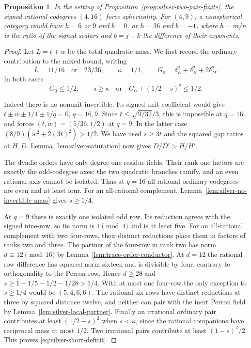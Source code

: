 \documentclass[11pt,reqno]{amsart}
\newtheorem{proposition}[theorem]{Proposition}
\theoremstyle{remark}\newtheorem{remark}[theorem]{Remark}
\numberwithin{equation}{section}
\begin{document}
\begin{proposition}\label{prop:silver-four-sixteen}
In the setting of Proposition~\ref{prop:silver-two-pair-finite}, the
signed rational codegrees $(4,16)$ force sphericality. For $(4,9)$,
a nonspherical category would have $h=6$ or $9$ and $b=0$, or
$h=36$ and $b=-1$, where $h=m/n$ is the ratio of the signed scalars
and $b=j-k$ the difference of their exponents.
\end{proposition}
\begin{proof}
Let $L=t+w$ be the total quadratic mass. We first record the
ordinary contribution to the mixed bound, writing
\[
 L=11/16\quad\text{or}\quad23/36,\qquad \kappa=1/4,
 \qquad G_0=\delta_E^2+\delta_H^2+2\delta_D^2 .
\]
In both cases
\begin{equation}\label{eq:silver-short-deficit}
 G_0\le1/2,\qquad s\ge\kappa\quad\text{or}\quad
 G_0+(1/2-s)^2\le1/2 .
\end{equation}

Indeed there is no nonunit invertible. Its signed unit coefficient
would give $t\pm w\pm1/4\pm1/q=0$, $q=16,9$. Since
$t\le\sqrt{9/32}/3$, this is impossible at $q=16$ and forces
$(t,w)=(5/36,1/2)$ at $q=9$. In the latter case
$(8/9)(w^2+2(3t)^2)>1/2$. We have used $s\ge3t$ and the
squared gap ratios at $H,D$. Lemma~\ref{lem:silver-saturation}
now gives $D/D'>H/H'$.

The dyadic orders have only degree-one residue fields. Their
rank-one factors are exactly the odd-codegree axes: the two
quadratic branches ramify, and an even rational axis cannot be
isolated. Thus at $q=16$ all rational ordinary codegrees are even
and at least four. For an all-rational complement,
Lemma~\ref{lem:silver-no-invertible-mass} gives $s\ge1/4$.

At $q=9$ there is exactly one isolated odd row. Its reduction agrees
with the signed nine-row, so its norm is $1\pmod4$ and is at least
five. For an all-rational complement with two four-rows, their
distinct reductions place them in factors of ranks two and three.
The partner of the four-row in rank two has norm $d\equiv12\pmod{16}$
by Lemma~\ref{lem:trace-order-conductor}. At $d=12$ the rational
row difference has squared norm sixteen and is divisible by four,
contrary to orthogonality to the Perron row. Hence $d\ge28$ and
$s\ge1-1/5-1/2-1/28>1/4$. With at most one four-row the only
exception to $s\ge1/4$ would be $(5,4,6,6)$. The rational six-rows
have distinct reductions at three by squared distance twelve, and
neither can pair with the inert Perron field by
Lemma~\ref{lem:silver-local-partner}. Finally an irrational ordinary
pair contributes at least $(1/2-s)^2$ when $s<\kappa$, since the
rational companions have reciprocal mass at most $1/2$.
Two irrational pairs contribute at least $(1-s)^2/2$.
This proves \eqref{eq:silver-short-deficit}.


\end{proof}
\end{document}
